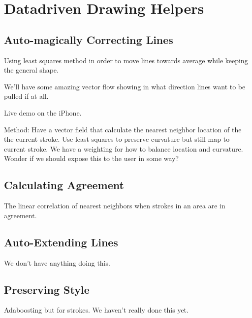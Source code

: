 \section{Datadriven Drawing Helpers}

\subsection{Auto-magically Correcting Lines}
Using least squares method in order to move lines towards average while keeping the general shape.

We'll have some amazing vector flow showing in what direction lines want to be pulled if at all.

Live demo on the iPhone.

Method:
Have a vector field that calculate the nearest neighbor location of the the current stroke.
Use least squares to preserve curvature but still map to current stroke.
We have a weighting for how to balance location and curvature. Wonder if we should expose this to the user in some way?

\subsection{Calculating Agreement}
The linear correlation of nearest neighbors when strokes in an area are in agreement.

\subsection{Auto-Extending Lines}
We don't have anything doing this.

\subsection{Preserving Style}
Adaboosting but for strokes. We haven't really done this yet.

